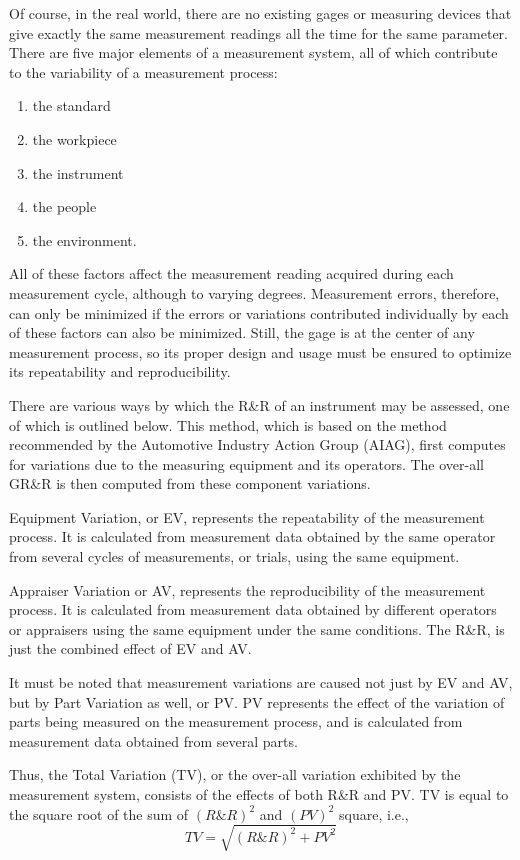 \documentclass[]{article}
\begin{document}
Of course, in the real world, there are no existing gages or measuring devices that give exactly the same measurement readings all the time for the same parameter.  There are five  major elements of a measurement system, all of which contribute to the variability of a measurement process: 
\begin{enumerate}
\item the standard
\item the workpiece
\item the instrument
\item the people
\item the environment.
\end{enumerate}
              
All of these factors affect the measurement reading acquired during each measurement cycle, although to varying degrees.  Measurement errors, therefore, can only be minimized if the errors or variations contributed individually by each of these factors can also be minimized. Still, the gage is at the center of any measurement process, so its proper design and usage must be ensured to optimize its repeatability and reproducibility.

  
There are various ways by which the R\&R of an instrument may be assessed, one of which is outlined below. This method, which is based on the method recommended by the Automotive Industry Action Group (AIAG), first computes for variations due to the measuring equipment and its operators. The over-all GR\&R is then computed from these component variations.

  
Equipment Variation, or EV, represents the repeatability of the measurement process.  It is calculated from measurement data obtained by the same operator from several cycles of measurements, or trials, using the same equipment. 

Appraiser Variation or AV, represents the reproducibility of the measurement process.  It is calculated from measurement data obtained by different operators or appraisers using the same equipment under the same conditions.  The R\&R, is just the combined effect of EV and AV.

   
It must be noted that measurement variations are caused not just by EV and AV, but by Part Variation as well, or PV. PV represents the effect of the variation of parts being measured on the measurement process, and is calculated from measurement data obtained from several parts. 

   
Thus, the Total Variation (TV), or the over-all variation exhibited by the measurement system, consists of the effects of both R\&R and PV.  TV is equal to the square root of the sum of $(R\&R)^2$ and $(PV)^2$ square, i.e.,  
\[TV = \sqrt{ (R\&R)^2 + PV^2 }\]
   
\end{document}
